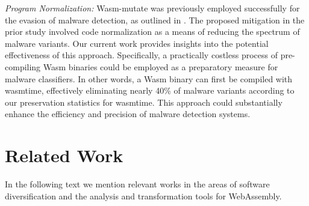 \documentclass[sigplan,screen]{acmart}
\newcommand{\tool}{Wasm-mutate\xspace}
\newcommand{\wasm}{Wasm\xspace}
\newcommand{\Wasm}{WebAssembly\xspace}
\begin{document}
\emph{Program Normalization:} \tool was previously employed successfully for the evasion of malware detection, as outlined in \cite{CABRERAARTEAGA2023103296}. 
The proposed mitigation in the prior study involved code normalization as a means of reducing the spectrum of malware variants. 
Our current work provides insights into the potential effectiveness of this approach. 
Specifically, a practically costless process of pre-compiling Wasm binaries could be employed as a preparatory measure for malware classifiers. 
In other words, a \wasm binary can first be compiled with wasmtime, effectively eliminating nearly 40\% of malware variants according to our preservation statistics for wasmtime. 
This approach could substantially enhance the efficiency and precision of malware detection systems.





\section{Related Work}
\label{rw}

In the following text we mention relevant works in the areas of software diversification and the analysis and transformation tools for \Wasm.
\end{document}
